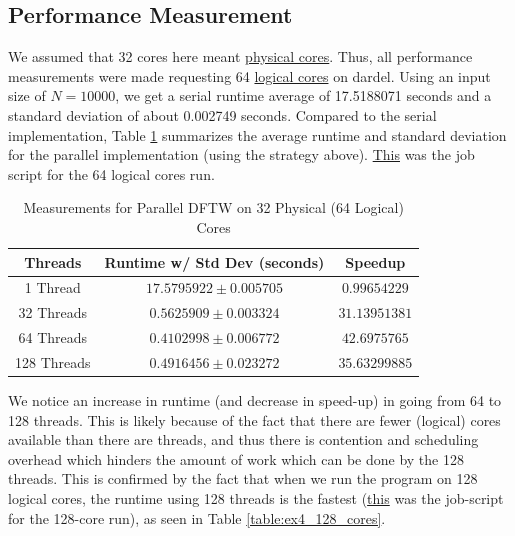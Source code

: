\documentclass[a4paper,10pt]{article}
\begin{document}
\subsection{Performance Measurement}
We assumed that 32 cores here meant \underline{physical cores}. Thus, all performance measurements were made requesting 64 \underline{logical cores} on dardel. Using an input size of $N = 10000$, we get a serial runtime average of 17.5188071 seconds and a standard deviation of about 0.002749 seconds. Compared to the serial implementation, Table \ref{table:ex4_64_cores} summarizes the average runtime and standard deviation for the parallel implementation (using the strategy above). \href{https://github.com/paulmyr/DD2356-MethodsHPC/blob/master/3_open_mp/exercise4/job_scripts/dftw_parallel_job.sh}{This} was the job script for the 64 logical cores run.

\begin{table}[h!]
\centering
\begin{tabular}{|c|c|c|}
\hline
\textbf{Threads} & \textbf{Runtime w/ Std Dev (seconds)} & \textbf{Speedup} \\
\hline
1 Thread  & $17.5795922 \pm 0.005705$  & $0.99654229$ \\
32 Threads & $0.5625909 \pm 0.003324$ & $31.13951381$ \\
64 Threads & $0.4102998 \pm 0.006772$ & $42.6975765$ \\
128 Threads & $0.4916456 \pm 0.023272$ & $35.63299885$ \\
\hline
\end{tabular}
\caption{Measurements for Parallel DFTW on 32 Physical (64 Logical) Cores}
\label{table:ex4_64_cores}
\end{table}

We notice an increase in runtime (and decrease in speed-up) in going from 64 to 128 threads. This is likely because of the fact that there are fewer (logical) cores available than there are threads, and thus there is contention and scheduling overhead which hinders the amount of work which can be done by the 128 threads. This is confirmed by the fact that when we run the program on 128 logical cores, the runtime using 128 threads is the fastest (\href{https://github.com/paulmyr/DD2356-MethodsHPC/blob/master/3_open_mp/exercise4/job_scripts/dftw_parallel_all_cores_job.sh}{this} was the job-script for the 128-core run), as seen in Table \ref{table:ex4_128_cores}. 
\end{document}
